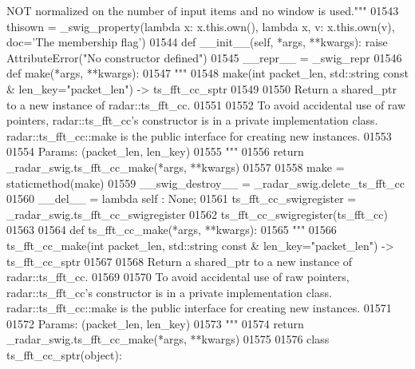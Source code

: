 \begin{DoxyCode}
{{{{{{{{       NOT normalized on the number of input items and no window is used."""}
01543     thisown = _swig_property(\textcolor{keyword}{lambda} x: x.this.own(), \textcolor{keyword}{lambda} x, v: x.this.own(v), doc=\textcolor{stringliteral}{'The membership flag'})
01544     \textcolor{keyword}{def }__init__(self, *args, **kwargs): \textcolor{keywordflow}{raise} AttributeError(\textcolor{stringliteral}{"No constructor defined"})
01545     \_\_repr\_\_ = \_swig\_repr
01546     \textcolor{keyword}{def }make(*args, **kwargs):
01547         \textcolor{stringliteral}{"""}
01548 \textcolor{stringliteral}{        make(int packet\_len, std::string const & len\_key="packet\_len") -> ts\_fft\_cc\_sptr}
01549 \textcolor{stringliteral}{}
01550 \textcolor{stringliteral}{        Return a shared\_ptr to a new instance of radar::ts\_fft\_cc.}
01551 \textcolor{stringliteral}{}
01552 \textcolor{stringliteral}{        To avoid accidental use of raw pointers, radar::ts\_fft\_cc's constructor is in a private
       implementation class. radar::ts\_fft\_cc::make is the public interface for creating new instances.}
01553 \textcolor{stringliteral}{}
01554 \textcolor{stringliteral}{        Params: (packet\_len, len\_key)}
01555 \textcolor{stringliteral}{        """}
01556         \textcolor{keywordflow}{return} \_radar\_swig.ts\_fft\_cc\_make(*args, **kwargs)
01557 
01558     make = staticmethod(make)
01559     \_\_swig\_destroy\_\_ = \_radar\_swig.delete\_ts\_fft\_cc
01560     \_\_del\_\_ = \textcolor{keyword}{lambda} self : \textcolor{keywordtype}{None};
01561 ts\_fft\_cc\_swigregister = \_radar\_swig.ts\_fft\_cc\_swigregister
01562 ts_fft_cc_swigregister(ts\_fft\_cc)
01563 
01564 \textcolor{keyword}{def }ts_fft_cc_make(*args, **kwargs):
01565   \textcolor{stringliteral}{"""}
01566 \textcolor{stringliteral}{    ts\_fft\_cc\_make(int packet\_len, std::string const & len\_key="packet\_len") -> ts\_fft\_cc\_sptr}
01567 \textcolor{stringliteral}{}
01568 \textcolor{stringliteral}{    Return a shared\_ptr to a new instance of radar::ts\_fft\_cc.}
01569 \textcolor{stringliteral}{}
01570 \textcolor{stringliteral}{    To avoid accidental use of raw pointers, radar::ts\_fft\_cc's constructor is in a private implementation
       class. radar::ts\_fft\_cc::make is the public interface for creating new instances.}
01571 \textcolor{stringliteral}{}
01572 \textcolor{stringliteral}{    Params: (packet\_len, len\_key)}
01573 \textcolor{stringliteral}{    """}
01574   \textcolor{keywordflow}{return} \_radar\_swig.ts\_fft\_cc\_make(*args, **kwargs)
01575 
01576 \textcolor{keyword}{class }ts_fft_cc_sptr(object):
}}}}}}}
\end{DoxyCode}
